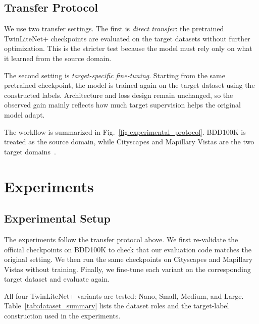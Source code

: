 \documentclass[conference]{IEEEtran}
\begin{document}
\subsection{Transfer Protocol}
We use two transfer settings. The first is \textit{direct transfer}: the pretrained TwinLiteNet+ checkpoints are evaluated on the target datasets without further optimization. This is the stricter test because the model must rely only on what it learned from the source domain.

The second setting is \textit{target-specific fine-tuning}. Starting from the same pretrained checkpoint, the model is trained again on the target dataset using the constructed labels. Architecture and loss design remain unchanged, so the observed gain mainly reflects how much target supervision helps the original model adapt.

The workflow is summarized in Fig.~\ref{fig:experimental_protocol}. BDD100K is treated as the source domain, while Cityscapes and Mapillary Vistas are the two target domains~\cite{ref2,ref3,ref4}.


\section{Experiments}

\subsection{Experimental Setup}
The experiments follow the transfer protocol above. We first re-validate the official checkpoints on BDD100K to check that our evaluation code matches the original setting. We then run the same checkpoints on Cityscapes and Mapillary Vistas without training. Finally, we fine-tune each variant on the corresponding target dataset and evaluate again.

All four TwinLiteNet+ variants are tested: Nano, Small, Medium, and Large. Table~\ref{tab:dataset_summary} lists the dataset roles and the target-label construction used in the experiments.

\begin{table}[!t]
  \centering
  \caption{Datasets and target-label construction used in this study.}
  \label{tab:dataset_summary}
\end{table}
\end{document}
